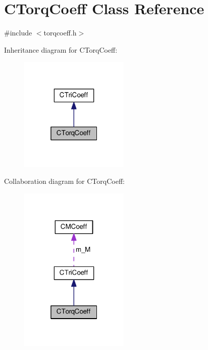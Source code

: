 \hypertarget{classCTorqCoeff}{\section{C\-Torq\-Coeff Class Reference}
\label{classCTorqCoeff}
}


{\ttfamily \#include $<$torqcoeff.\-h$>$}



Inheritance diagram for C\-Torq\-Coeff\-:\nopagebreak
\begin{figure}[H]
\begin{center}
\leavevmode
\includegraphics[width=148pt]{classCTorqCoeff__inherit__graph}
\end{center}
\end{figure}


Collaboration diagram for C\-Torq\-Coeff\-:
\nopagebreak
\begin{figure}[H]
\begin{center}
\leavevmode
\includegraphics[width=148pt]{classCTorqCoeff__coll__graph}
\end{center}
\end{figure}
